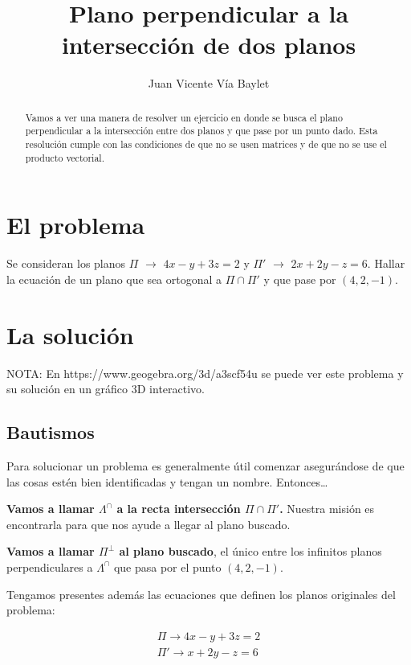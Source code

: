 \documentclass[10pt,a4paper]{article}
\begin{document}
\title{Plano perpendicular a la intersección de dos planos}
\author{Juan Vicente Vía Baylet}
\maketitle

\begin{abstract}
  Vamos a ver una manera de resolver un ejercicio en donde se busca el plano perpendicular a la
  intersección entre dos planos y que pase por un punto dado.
  Esta resolución cumple con las condiciones de que no se usen matrices y
  de que no se use el producto vectorial.
\end{abstract}


\section{El problema}


Se consideran los planos $\Pi$ $\rightarrow$  $4x-y+3z=2$ y $\Pi'$ $\rightarrow$ $2x+2y-z=6$.
Hallar la ecuación de un plano que sea ortogonal a $\Pi\cap\Pi'$ y que pase por $(4,2,-1)$.

\section{La solución}

NOTA: En https://www.geogebra.org/3d/a3scf54u se puede ver este problema y su solución en un gráfico 3D interactivo.

\subsection{Bautismos}

Para solucionar un problema es generalmente útil comenzar asegurándose de que las cosas
estén bien identificadas y tengan un nombre. Entonces\dots

\textbf{Vamos a llamar \textbf{$\Lambda^\cap$} a la recta intersección $\Pi\cap\Pi'$.} Nuestra misión es encontrarla para que nos ayude
a llegar al plano buscado.

\textbf{Vamos a llamar $\Pi^\perp$ al plano buscado}, el único entre los infinitos
planos perpendiculares a {$\Lambda^\cap$} que pasa por el punto $(4,2,-1)$.

Tengamos presentes además las ecuaciones que definen los planos originales del problema:

\begin{gather}
  \Pi \rightarrow 4x-y+3z=2 \label{eq:planopi}\\
  \Pi'\rightarrow x+2y-z=6 \label{eq:planopiprima}
\end{gather}
\end{document}
